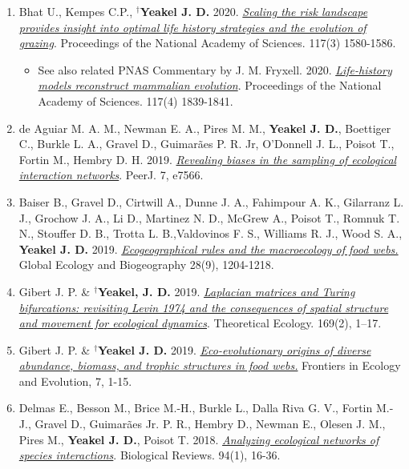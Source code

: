 \documentclass[margin,line,12pt]{res}
\begin{document}
\begin{resume}
\begin{enumerate}
\item Bhat U., Kempes C.P., \textbf{${}^\dag$Yeakel J. D.} 2020. \href{https://doi.org/10.1073/pnas.1907998117}{\emph{Scaling the risk landscape provides insight into optimal life history strategies and the evolution of grazing}}. Proceedings of the National Academy of Sciences.  117(3) 1580-1586.
  {\footnotesize
	\begin{itemize}
		\item See also related PNAS Commentary by J. M. Fryxell. 2020. \href{https://www.pnas.org/content/117/4/1839}{\emph{Life-history models reconstruct mammalian evolution}}. Proceedings of the National Academy of Sciences. 117(4) 1839-1841.
	\end{itemize}
  }
\item de Aguiar M. A. M., Newman E. A., Pires M. M., \textbf{Yeakel J. D.}, Boettiger C., Burkle L. A., Gravel D., Guimar\~aes P. R. Jr, O’Donnell J. L., Poisot T., Fortin M., Hembry D. H. 2019. \href{https://peerj.com/articles/7566/}{\emph{Revealing biases in the sampling of ecological interaction networks}}. PeerJ. 7, e7566.

\item Baiser B., Gravel D., Cirtwill A., Dunne J. A., Fahimpour A. K., Gilarranz L. J., Grochow J. A., Li D., Martinez N. D., McGrew A., Poisot T., Romnuk T. N., Stouffer D. B., Trotta L. B.,Valdovinos F. S., Williams R. J., Wood S. A., \textbf{Yeakel J. D.} 2019. \href{https://onlinelibrary.wiley.com/doi/abs/10.1111/geb.12925}{\emph{Ecogeographical rules and the macroecology of food webs.}} Global Ecology and Biogeography 28(9), 1204-1218.

\item Gibert J. P. \& \textbf{${}^\dag$Yeakel, J. D.} 2019. \href{https://link.springer.com/article/10.1007/s12080-018-0403-2}{\emph{Laplacian matrices and Turing bifurcations: revisiting Levin 1974 and the consequences of spatial structure and movement for ecological dynamics}}. Theoretical Ecology. 169(2), 1–17.

\item Gibert J. P. \& \textbf{${}^\dag$Yeakel J. D.} 2019. \href{https://www.frontiersin.org/articles/10.3389/fevo.2019.00015/full}{\emph{Eco-evolutionary origins of diverse abundance, biomass, and trophic structures in food webs.}} Frontiers in Ecology and Evolution, 7, 1-15.
  
\item Delmas E., Besson M., Brice M.-H., Burkle L., Dalla Riva G. V., Fortin M.-J., Gravel D., Guimar\~aes Jr. P. R., Hembry D., Newman E., Olesen J. M., Pires M., \textbf{Yeakel J. D.}, Poisot T. 2018. \href{https://onlinelibrary.wiley.com/doi/abs/10.1111/brv.12433}{\emph{Analyzing ecological networks of species interactions}}. Biological Reviews. 94(1), 16-36.


\end{enumerate}
\end{resume}
\end{document}
